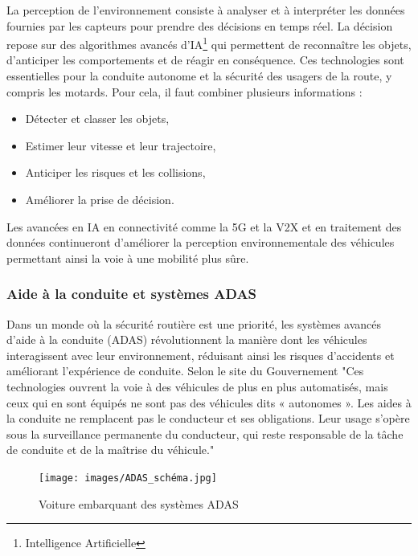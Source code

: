 La perception de l'environnement consiste à analyser et à interpréter les données fournies par les capteurs pour prendre des décisions en temps réel. La décision repose sur des algorithmes avancés d'IA\footnote{Intelligence Artificielle} qui permettent de reconnaître les objets, d'anticiper les comportements et de réagir en conséquence. Ces technologies sont essentielles pour la conduite autonome et la sécurité des usagers de la route, y compris les motards.
Pour cela, il faut combiner plusieurs informations :
\begin{itemize}
    \item Détecter et classer les objets,
    \item Estimer leur vitesse et leur trajectoire,
    \item Anticiper les risques et les collisions,
    \item Améliorer la prise de décision.
\end{itemize}
Les avancées en IA en connectivité comme la 5G et la V2X et en traitement des données continueront d’améliorer la perception environnementale des véhicules permettant ainsi la voie à une mobilité plus sûre.

\subsubsection{Aide à la conduite et systèmes ADAS}
Dans un monde où la sécurité routière est une priorité, les systèmes avancés d’aide à la conduite (ADAS) révolutionnent la manière dont les véhicules interagissent avec leur environnement, réduisant ainsi les risques d’accidents et améliorant l’expérience de conduite.
Selon le site du Gouvernement \cite{adas_gouv} "Ces technologies ouvrent la voie à des véhicules de plus en plus automatisés, mais ceux qui en sont équipés ne sont pas des véhicules dits « autonomes ». Les aides à la conduite ne remplacent pas le conducteur et ses obligations. Leur usage s’opère sous la surveillance permanente du conducteur, qui reste responsable de la tâche de conduite et de la maîtrise du véhicule."
\begin{figure}[H]
    \centering
    \texttt{[image: images/ADAS\_schéma.jpg]} 
    \caption{Voiture embarquant des systèmes ADAS\cite{continental_adas}}
\end{figure}


